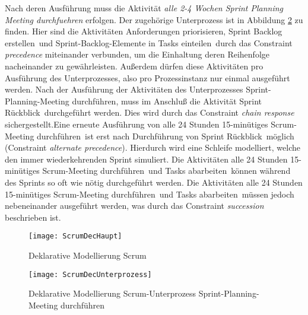 Nach deren Ausführung muss die Aktivität \textit{alle 2-4 Wochen Sprint Planning Meeting durchfuehren} erfolgen. Der zugehörige Unterprozess ist in Abbildung \ref{fig:ScrumDecUnterprozess} zu finden. Hier sind die Aktivitäten \grqq Anforderungen priorisieren\grqq, \grqq Sprint Backlog erstellen\grqq \ und \grqq Sprint-Backlog-Elemente in Tasks einteilen\grqq \ durch das Constraint \textit{precedence} miteinander verbunden, um die Einhaltung deren Reihenfolge nacheinander zu gewährleisten. Außerdem dürfen diese Aktivitäten pro Ausführung des Unterprozesses, also pro Prozessinstanz nur einmal ausgeführt werden.\newline
Nach der Ausführung der Aktivitäten des Unterprozesses Sprint-Planning-Meeting durchführen, muss im Anschluß die Aktivität \grqq Sprint Rückblick\grqq \ durchgeführt werden. Dies wird durch das Constraint \textit{chain response} sichergestellt.Eine erneute Ausführung von \grqq alle 24 Stunden 15-minütiges Scrum-Meeting durchführen\grqq \ ist erst nach Durchführung von \grqq Sprint Rückblick\grqq \ möglich (Constraint \textit{alternate precedence}). Hierdurch wird eine Schleife modelliert, welche den immer wiederkehrenden Sprint simuliert.\newline
Die Aktivitäten \grqq alle 24 Stunden 15-minütiges Scrum-Meeting durchführen\grqq \ und \grqq Tasks abarbeiten\grqq \ können während des Sprints so oft wie nötig durchgeführt werden. Die Aktivitäten \grqq alle 24 Stunden 15-minütiges Scrum-Meeting durchführen\grqq \ und \grqq Tasks abarbeiten\grqq \ müssen jedoch nebeneinander ausgeführt werden, was durch das Constraint \textit{succession} beschrieben ist. \newline


\begin{figure}[htp]
\begin{center}
  \texttt{[image: ScrumDecHaupt]} %
  \caption{Deklarative Modellierung Scrum}
  \label{fig:ScrumDecHaupt}
\end{center}
\end{figure}



\begin{figure}[htp]
\begin{center}
  \texttt{[image: ScrumDecUnterprozess]} %
  \caption{Deklarative Modellierung Scrum-Unterprozess Sprint-Planning-Meeting durchführen}
  \label{fig:ScrumDecUnterprozess}
\end{center}
\end{figure}
\clearpage

